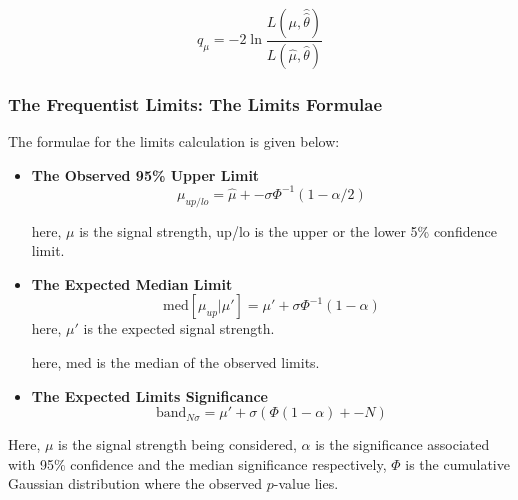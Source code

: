 \begin{equation}
    q_{\mu} = -2 \ln \frac{L(\mu, \hat{\hat{\theta}})}{L(\hat{\mu}, \hat{\theta})}
\label{teststats}
\end{equation}


\subsubsection{The Frequentist Limits: The Limits Formulae}
\label{sec:freqlimits}

The formulae for the limits calculation is given below:

\begin{itemize}


\item \textbf{The Observed 95\% Upper Limit}
\begin{equation}
\mu_{up/lo} = \hat{\mu} +- \sigma\Phi^{-1}(1-\alpha/2)
\end{equation}

here, $\mu$ is the signal strength, up/lo is the upper or the lower 5\% confidence limit. 

\item \textbf{The Expected Median Limit}
\begin{equation}
    \mathrm{med}[\mu_{up}|\mu'] = \mu' + \sigma\Phi^{-1}(1-\alpha) 
\end{equation}
here, $\mu'$ is the expected signal strength.


here, $\mathrm{med}$ is the  median of the observed limits.

\item \textbf{The Expected Limits Significance}
\begin{equation}
    \mathrm{band}_{N\sigma} = \mu' + \sigma(\Phi(1-\alpha)+-N)
\end{equation}

\end{itemize}


Here, $\mu$ is the signal strength being considered, $\alpha$ is the significance associated with 95$\%$ confidence and the median significance respectively, $\Phi$ is the cumulative Gaussian distribution where the observed $p$-value lies.


